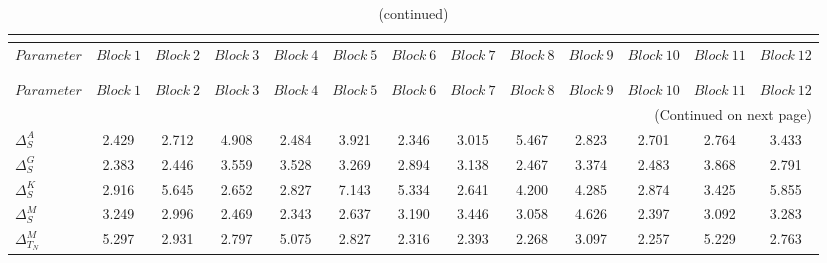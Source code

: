  
\begin{center}
\begin{longtable}{lcccccccccccc} 
\caption{MCMC Inefficiency factors per block}\\
 \label{Table:MCMC_inefficiency_factors}\\
\toprule 
$Parameter             $	 & 	 $     Block~1$	 & 	 $     Block~2$	 & 	 $     Block~3$	 & 	 $     Block~4$	 & 	 $     Block~5$	 & 	 $     Block~6$	 & 	 $     Block~7$	 & 	 $     Block~8$	 & 	 $     Block~9$	 & 	 $    Block~10$	 & 	 $    Block~11$	 & 	 $    Block~12$\\
\midrule \endfirsthead 
\caption{(continued)}\\
 \toprule \\ 
$Parameter             $	 & 	 $     Block~1$	 & 	 $     Block~2$	 & 	 $     Block~3$	 & 	 $     Block~4$	 & 	 $     Block~5$	 & 	 $     Block~6$	 & 	 $     Block~7$	 & 	 $     Block~8$	 & 	 $     Block~9$	 & 	 $    Block~10$	 & 	 $    Block~11$	 & 	 $    Block~12$\\
\midrule \endhead 
\midrule \multicolumn{13}{r}{(Continued on next page)} \\ \bottomrule \endfoot 
\bottomrule \endlastfoot 
$ {\Delta^{A}_{S}}     $	 & 	       2.429	 & 	       2.712	 & 	       4.908	 & 	       2.484	 & 	       3.921	 & 	       2.346	 & 	       3.015	 & 	       5.467	 & 	       2.823	 & 	       2.701	 & 	       2.764	 & 	       3.433 \\ 
$ {\Delta^{G}_{S}}     $	 & 	       2.383	 & 	       2.446	 & 	       3.559	 & 	       3.528	 & 	       3.269	 & 	       2.894	 & 	       3.138	 & 	       2.467	 & 	       3.374	 & 	       2.483	 & 	       3.868	 & 	       2.791 \\ 
$ {\Delta^{K}_{S}}     $	 & 	       2.916	 & 	       5.645	 & 	       2.652	 & 	       2.827	 & 	       7.143	 & 	       5.334	 & 	       2.641	 & 	       4.200	 & 	       4.285	 & 	       2.874	 & 	       3.425	 & 	       5.855 \\ 
$ {\Delta^{M}_{S}}     $	 & 	       3.249	 & 	       2.996	 & 	       2.469	 & 	       2.343	 & 	       2.637	 & 	       3.190	 & 	       3.446	 & 	       3.058	 & 	       4.626	 & 	       2.397	 & 	       3.092	 & 	       3.283 \\ 
$ {\Delta^{M}_{T_N}}   $	 & 	       5.297	 & 	       2.931	 & 	       2.797	 & 	       5.075	 & 	       2.827	 & 	       2.316	 & 	       2.393	 & 	       2.268	 & 	       3.097	 & 	       2.257	 & 	       5.229	 & 	       2.763 \\ 

\end{longtable}
\end{center}
